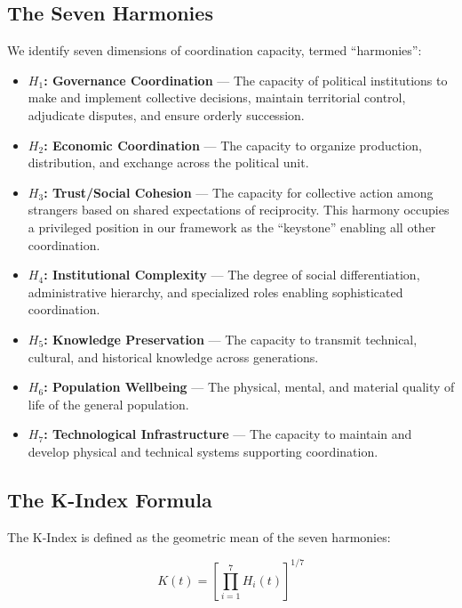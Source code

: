 \documentclass[11pt,a4paper]{article}
\newcommand{\Hone}{H_1}
\newcommand{\Htwo}{H_2}
\newcommand{\Hthree}{H_3}
\newcommand{\Hfour}{H_4}
\newcommand{\Hfive}{H_5}
\newcommand{\Hsix}{H_6}
\newcommand{\Hseven}{H_7}
\begin{document}
\subsection{The Seven Harmonies}

We identify seven dimensions of coordination capacity, termed ``harmonies'':

\begin{itemize}
\item \textbf{$\Hone$: Governance Coordination} --- The capacity of political institutions to make and implement collective decisions, maintain territorial control, adjudicate disputes, and ensure orderly succession.

\item \textbf{$\Htwo$: Economic Coordination} --- The capacity to organize production, distribution, and exchange across the political unit.

\item \textbf{$\Hthree$: Trust/Social Cohesion} --- The capacity for collective action among strangers based on shared expectations of reciprocity. This harmony occupies a privileged position in our framework as the ``keystone'' enabling all other coordination.

\item \textbf{$\Hfour$: Institutional Complexity} --- The degree of social differentiation, administrative hierarchy, and specialized roles enabling sophisticated coordination.

\item \textbf{$\Hfive$: Knowledge Preservation} --- The capacity to transmit technical, cultural, and historical knowledge across generations.

\item \textbf{$\Hsix$: Population Wellbeing} --- The physical, mental, and material quality of life of the general population.

\item \textbf{$\Hseven$: Technological Infrastructure} --- The capacity to maintain and develop physical and technical systems supporting coordination.
\end{itemize}

\subsection{The K-Index Formula}

The K-Index is defined as the geometric mean of the seven harmonies:

\begin{equation}
K(t) = \left[\prod_{i=1}^{7} H_i(t)\right]^{1/7}
\end{equation}
\end{document}
